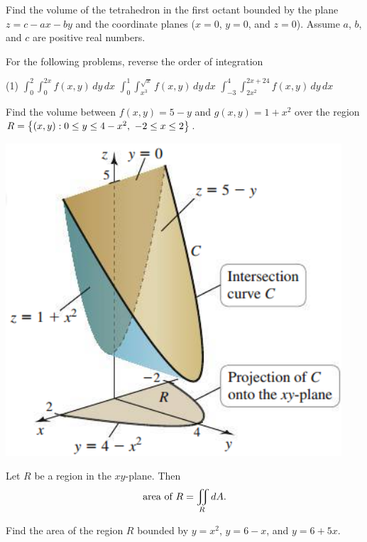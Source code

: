 \documentclass[mathNotesPreamble]{subfiles}
\begin{document}
  \begin{ex*}
    Find the volume of the tetrahedron in the first octant bounded by the plane $z=c-ax-by$ and the coordinate planes ($x=0$, $y=0$, and $z=0$). Assume $a$, $b$, and $c$ are positive real numbers.
  \end{ex*}
  \pagebreak

  \begin{ex*}
    For the following problems, reverse the order of integration
  \end{ex*}
  \begin{tasks}[after-item-skip=\stretch{1}, label=\textbullet](1)
    \task 
      $\displaystyle \int_{0}^{2} \int_{0}^{2x} f(x,y)\,dy\,dx$
    \task 
      $\displaystyle \int_{0}^{1} \int_{x^3}^{\sqrt{x}} f(x,y)\,dy\,dx$
    \task 
      $\displaystyle \int_{-3}^{4} \int_{2x^2}^{2x+24} f(x,y)\,dy\,dx$
  \end{tasks}
  \pagebreak

  \begin{ex*}
    Find the volume between $f(x,y)=5-y$ and $g(x,y)=1+x^2$ over the region $R={\left\{(x,y): 0\leq y\leq 4-x^2,\ -2\leq x\leq 2\right\}}$.
  \end{ex*}
  \begin{flushright}
    \includegraphics[width=0.3\linewidth]{images/briggs_16_02/fig16_23}
  \end{flushright}
  \pagebreak

  \begin{thmBox*}
    Let $R$ be a region in the $xy$-plane. Then
      \[\textnormal{area of } R=\iint\limits_R dA.\]
  \end{thmBox*}

  \begin{ex*}
    Find the area of the region $R$ bounded by $y=x^2$, $y=6-x$, and $y=6+5x$.
  \end{ex*}

  \pagebreak
  
\end{document}
